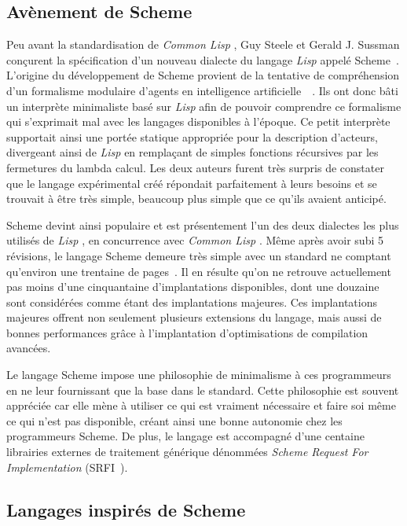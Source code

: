 \documentclass[12pt,oneside,letterpaper,francais]{book}
\newcommand{\lisp}{{\textit{Lisp }}}
\newcommand{\clisp}{{\textit{Common Lisp }}}
\begin{document}
\subsection{Avènement de Scheme}
Peu avant la standardisation de \clisp, Guy Steele et Gerald
J. Sussman conçurent la spécification d'un nouveau dialecte du langage
\lisp appelé Scheme~\cite{SCHEME_ORIGINS}. L'origine du développement
de Scheme provient de la tentative de compréhension d'un formalisme
modulaire d'agents en intelligence
artificielle~\cite{ACTOR}~\cite{Scheme-History}. Ils ont donc bâti un
interprète minimaliste basé sur \lisp afin de pouvoir comprendre ce
formalisme qui s'exprimait mal avec les langages disponibles à
l'époque. Ce petit interprète supportait ainsi une portée statique
appropriée pour la description d'acteurs, divergeant ainsi de \lisp en
remplaçant de simples fonctions récursives par les fermetures du
lambda calcul. Les deux auteurs furent très surpris de constater que
le langage expérimental créé répondait parfaitement à leurs besoins et
se trouvait à être très simple, beaucoup plus simple que ce qu'ils
avaient anticipé. 

Scheme devint ainsi populaire et est présentement l'un des deux
dialectes les plus utilisés de \lisp, en concurrence avec \clisp. Même
après avoir subi 5 révisions, le langage Scheme demeure très simple
avec un standard ne comptant qu'environ une trentaine de
pages~\cite{R5RS}. Il en résulte qu'on ne retrouve actuellement pas
moins d'une cinquantaine d'implantations disponibles, dont une
douzaine sont considérées comme étant des implantations majeures. Ces
implantations majeures offrent non seulement plusieurs extensions du
langage, mais aussi de bonnes performances grâce à l'implantation
d'optimisations de compilation avancées.

Le langage Scheme impose une philosophie de minimalisme à ces
programmeurs en ne leur fournissant que la base dans le
standard. Cette philosophie est souvent appréciée car elle mène à
utiliser ce qui est vraiment nécessaire et faire soi même ce qui n'est
pas disponible, créant ainsi une bonne autonomie chez les programmeurs
Scheme. De plus, le langage est accompagné d'une centaine librairies
externes de traitement générique dénommées \textit{Scheme Request For Implementation} (SRFI~\cite{SRFI}).

\subsection{Langages inspirés de Scheme}
\end{document}
